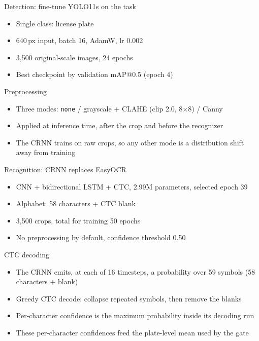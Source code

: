 \documentclass[10pt]{beamer}
\begin{document}
\begin{frame}{Detection: fine-tune YOLO11s on the task}
\begin{itemize}
  \item Single class: license plate
  \item 640\,px input, batch 16, AdamW, lr 0.002
  \item 3,500 original-scale images, 24 epochs
  \item Best checkpoint by validation mAP@0.5 (epoch 4)
\end{itemize}
\end{frame}

\begin{frame}{Preprocessing}
\begin{itemize}
  \item Three modes: \texttt{none} / grayscale $+$ CLAHE (clip 2.0, 8$\times$8) / Canny
  \item Applied at inference time, after the crop and before the recognizer
  \item The CRNN trains on raw crops, so any other mode is a distribution shift away from training
\end{itemize}
\end{frame}

\begin{frame}{Recognition: CRNN replaces EasyOCR}
\begin{itemize}
  \item CNN + bidirectional LSTM + CTC, 2.99M parameters, selected epoch 39
  \item Alphabet: 58 characters + CTC blank
  \item 3,500 crops, total for training 50 epochs
  \item No preprocessing by default, confidence threshold 0.50
\end{itemize}
\end{frame}


\begin{frame}{CTC decoding}
\begin{itemize}
  \item The CRNN emits, at each of 16 timesteps, a probability over 59 symbols (58 characters $+$ blank)
  \item Greedy CTC decode: collapse repeated symbols, then remove the blanks
  \item Per-character confidence is the maximum probability inside its decoding run
  \item These per-character confidences feed the plate-level mean used by the gate
\end{itemize}
\end{frame}
\end{document}
